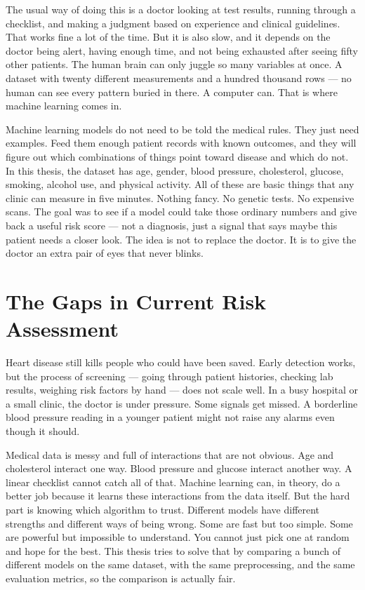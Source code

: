 \documentclass[12pt, a4paper, oneside]{book}
\begin{document}
The usual way of doing this is a doctor looking at test results, running through a checklist, and making a judgment based on experience and clinical guidelines. That works fine a lot of the time. But it is also slow, and it depends on the doctor being alert, having enough time, and not being exhausted after seeing fifty other patients. The human brain can only juggle so many variables at once. A dataset with twenty different measurements and a hundred thousand rows — no human can see every pattern buried in there. A computer can. That is where machine learning comes in.

Machine learning models do not need to be told the medical rules. They just need examples. Feed them enough patient records with known outcomes, and they will figure out which combinations of things point toward disease and which do not. In this thesis, the dataset has age, gender, blood pressure, cholesterol, glucose, smoking, alcohol use, and physical activity. All of these are basic things that any clinic can measure in five minutes. Nothing fancy. No genetic tests. No expensive scans. The goal was to see if a model could take those ordinary numbers and give back a useful risk score — not a diagnosis, just a signal that says maybe this patient needs a closer look. The idea is not to replace the doctor. It is to give the doctor an extra pair of eyes that never blinks.

\section{The Gaps in Current Risk Assessment}
Heart disease still kills people who could have been saved. Early detection works, but the process of screening — going through patient histories, checking lab results, weighing risk factors by hand — does not scale well. In a busy hospital or a small clinic, the doctor is under pressure. Some signals get missed. A borderline blood pressure reading in a younger patient might not raise any alarms even though it should.

Medical data is messy and full of interactions that are not obvious. Age and cholesterol interact one way. Blood pressure and glucose interact another way. A linear checklist cannot catch all of that. Machine learning can, in theory, do a better job because it learns these interactions from the data itself. But the hard part is knowing which algorithm to trust. Different models have different strengths and different ways of being wrong. Some are fast but too simple. Some are powerful but impossible to understand. You cannot just pick one at random and hope for the best. This thesis tries to solve that by comparing a bunch of different models on the same dataset, with the same preprocessing, and the same evaluation metrics, so the comparison is actually fair.
\end{document}

